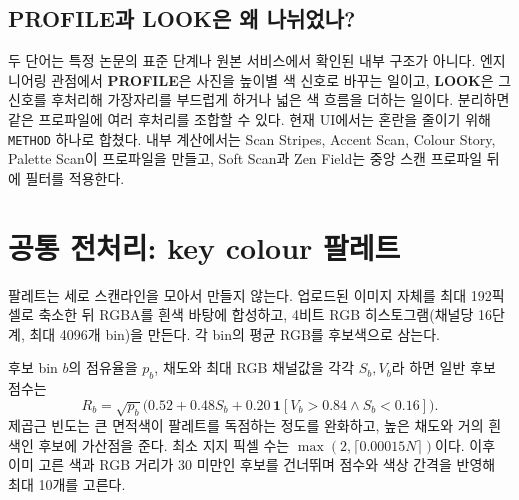 \documentclass[10pt]{article}
\begin{document}
\begin{center}
\end{center}

\subsection*{PROFILE과 LOOK은 왜 나뉘었나?}
두 단어는 특정 논문의 표준 단계나 원본 서비스에서 확인된 내부 구조가 아니다. 엔지니어링 관점에서 \textbf{PROFILE}은 사진을 높이별 색 신호로 바꾸는 일이고, \textbf{LOOK}은 그 신호를 후처리해 가장자리를 부드럽게 하거나 넓은 색 흐름을 더하는 일이다. 분리하면 같은 프로파일에 여러 후처리를 조합할 수 있다. 현재 UI에서는 혼란을 줄이기 위해 \texttt{METHOD} 하나로 합쳤다. 내부 계산에서는 Scan Stripes, Accent Scan, Colour Story, Palette Scan이 프로파일을 만들고, Soft Scan과 Zen Field는 중앙 스캔 프로파일 뒤에 필터를 적용한다.

\section{공통 전처리: key colour 팔레트}
팔레트는 세로 스캔라인을 모아서 만들지 않는다. 업로드된 이미지 자체를 최대 192픽셀로 축소한 뒤 RGBA를 흰색 바탕에 합성하고, 4비트 RGB 히스토그램(채널당 16단계, 최대 4096개 bin)을 만든다. 각 bin의 평균 RGB를 후보색으로 삼는다.

후보 bin $b$의 점유율을 $p_b$, 채도와 최대 RGB 채널값을 각각 $S_b,V_b$라 하면 일반 후보 점수는
\[
R_b=\sqrt{p_b}\bigl(0.52+0.48S_b+0.20\,\mathbf{1}[V_b>0.84\land S_b<0.16]\bigr).
\]
제곱근 빈도는 큰 면적색이 팔레트를 독점하는 정도를 완화하고, 높은 채도와 거의 흰색인 후보에 가산점을 준다. 최소 지지 픽셀 수는 $\max(2,\lceil0.00015N\rceil)$이다. 이후 이미 고른 색과 RGB 거리가 30 미만인 후보를 건너뛰며 점수와 색상 간격을 반영해 최대 10개를 고른다.
\end{document}
